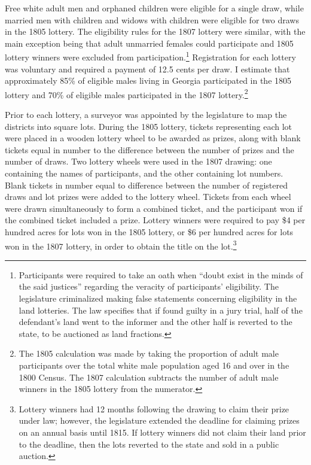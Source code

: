 Free white adult men and orphaned children were eligible for a single draw, while married men with children and widows with children were eligible for two draws in the 1805 lottery. The eligibility rules for the 1807 lottery were similar, with the main exception being that adult unmarried females could participate and 1805 lottery winners were excluded from participation.\footnote{Participants were required to take an oath when ``doubt exist in the minds of the said justices'' regarding the veracity of participants' eligibility. The legislature criminalized making false statements concerning eligibility in the land lotteries. The law specifies that if found guilty in a jury trial, half of the defendant's land went to the informer and the other half is reverted to the state, to be auctioned as land fractions.} Registration for each lottery was voluntary and required a payment of 12.5 cents per draw. I estimate that approximately 85\% of eligible males living in Georgia participated in the 1805 lottery and 70\% of eligible males participated in the 1807 lottery.\footnote{The 1805 calculation was made by taking the proportion of adult male participants over the total white male population aged 16 and over in the 1800 Census. The 1807 calculation subtracts the number of adult male winners in the 1805 lottery from the numerator.} 

Prior to each lottery, a surveyor was appointed by the legislature to map the districts into square lots. During the 1805 lottery, tickets representing each lot were placed in a wooden lottery wheel to be awarded as prizes, along with blank tickets equal in number to the difference between the number of prizes and the number of draws. Two lottery wheels were used in the 1807 drawing: one containing the names of participants, and the other containing lot numbers. Blank tickets in number equal to difference between the number of registered draws and lot prizes were added to the lottery wheel. Tickets from each wheel were drawn simultaneously to form a combined ticket, and the participant won if the combined ticket included a prize. Lottery winners were required to pay \$4 per hundred acres for lots won in the 1805 lottery, or \$6 per hundred acres for lots won in the 1807 lottery, in order to obtain the title on the lot.\footnote{Lottery winners had 12 months following the drawing to claim their prize under law; however, the legislature extended the deadline for claiming prizes on an annual basis until 1815. If lottery winners did not claim their land prior to the deadline, then the lots reverted to the state and sold in a public auction.} 

